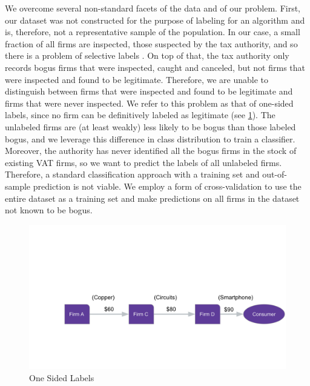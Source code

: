 We overcome several non-standard facets of the data and of our problem. First, our dataset was not constructed for the purpose of labeling for an algorithm and is, therefore, not a representative sample of the population. In our case, a small fraction of all firms are inspected, those suspected by the tax authority, and so there is a problem of selective labels \cite{lakkaraju2017selective}. On top of that, the tax authority only records bogus firms that were inspected, caught and canceled, but not firms that were inspected and found to be legitimate. Therefore, we are unable to distinguish between firms that were inspected and found to be legitimate and firms that were never inspected. We refer to this problem as that of one-sided labels, since no firm can be definitively labeled as legitimate (see \cref{fig:onesidedlabel}). The unlabeled firms are (at least weakly) less likely to be bogus than those labeled bogus, and we leverage this difference in class distribution to train a classifier. Moreover, the authority has never identified all the bogus firms in the stock of existing VAT firms, so we want to predict the labels of all unlabeled firms. Therefore, a standard classification approach with a training set and out-of-sample prediction is not viable. We employ a form of cross-validation to use the entire dataset as a training set and make predictions on all firms in the dataset not known to be bogus.

\begin{figure}[t]
  \includegraphics[width=.9\textwidth, page=5]{graphs/StylizedExample_New2.pdf}
  \caption{One Sided Labels}
  \label{fig:onesidedlabel}
\end{figure}


